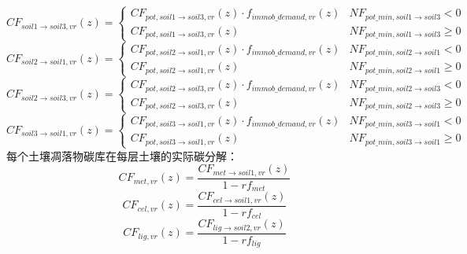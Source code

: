 \begin{equation}
    CF_{soil1 \rightarrow soil3, vr}(z)=\left\{\begin{array}{ll} CF_{pot, soil1 \rightarrow soil3, vr}(z) \cdot f_{immob\_demand, vr}(z) & NF_{pot\_{min, soil1 \rightarrow soil3}} <0 \\ 
    CF_{pot, soil1 \rightarrow soil3, vr}(z) & NF_{pot\_{min, soil1 \rightarrow soil3}} \geq 0
  \end{array}\right.
\end{equation}
\begin{equation}
    CF_{soil2 \rightarrow soil1, vr}(z)=\left\{\begin{array}{ll} CF_{pot, soil2 \rightarrow soil1, vr}(z) \cdot f_{immob\_demand, vr}(z) & NF_{pot\_{min, soil2 \rightarrow soil1}} <0 \\ 
    CF_{pot, soil2 \rightarrow soil1, vr}(z) & NF_{pot\_{min, soil2 \rightarrow soil1}} \geq 0
   \end{array}\right.
\end{equation}
\begin{equation}
    CF_{soil2 \rightarrow soil3, vr}(z)=\left\{\begin{array}{ll} CF_{pot, soil2 \rightarrow soil3, vr}(z) \cdot f_{immob\_demand, vr}(z) & NF_{pot\_{min, soil2 \rightarrow soil3}} <0 \\ 
    CF_{pot, soil2 \rightarrow soil3, vr}(z) & NF_{pot\_{min, soil2 \rightarrow soil3}} \geq 0
   \end{array}\right.
\end{equation}
\begin{equation}
    CF_{soil3 \rightarrow soil1, vr}(z)=\left\{\begin{array}{ll} CF_{pot, soil3 \rightarrow soil1, vr}(z) \cdot f_{immob\_demand, vr}(z) & NF_{pot\_{min, soil3 \rightarrow soil1}} <0 \\ 
    CF_{pot, soil3 \rightarrow soil1, vr}(z) & NF_{pot\_{min, soil3 \rightarrow soil1}} \geq 0
   \end{array}\right.
\end{equation}
每个土壤凋落物碳库在每层土壤的实际碳分解：
\begin{equation}
CF_{met, vr}(z)=\frac{CF_{met \rightarrow { soil1,vr }}(z)}{1-r f_{met}}
\end{equation}
\begin{equation}
C F_{cel, vr}(z)=\frac{C F_{cel \rightarrow soil1, vr}(z)}{1-r f_{cel}}
\end{equation}
\begin{equation}
C F_{lig, vr}(z)=\frac{C F_{lig \rightarrow soil2, vr}(z)}{1-r f_{lig}}
\end{equation}
